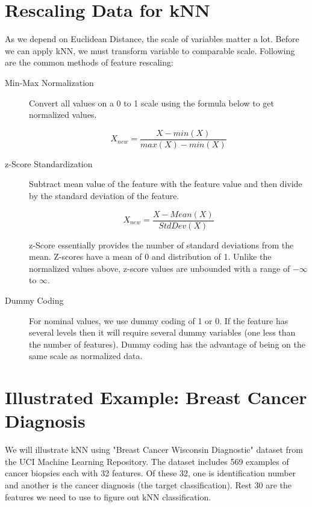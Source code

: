 \documentclass[11pt, letterpaper, twoside]{memoir}\usepackage{knitr}
\begin{document}
\section{Rescaling Data for kNN}

As we depend on Euclidean Distance, the scale of variables matter a lot. Before we can apply kNN, we must transform variable to comparable scale. Following are the common methods of feature rescaling:

\begin{description}

\item [Min-Max Normalization] Convert all values on a 0 to 1 scale using the formula below to get normalized values.

\[X_{new} = \frac{X - min(X)}{max(X) - min(X)}   \]

\item [z-Score Standardization] Subtract mean value of the feature with the feature value and then divide by the standard deviation of the feature.

\[X_{new} = \frac{X - Mean(X)}{StdDev(X)} \]

z-Score essentially provides the number of standard deviations from the mean. Z-scores have a mean of 0 and distribution of 1. Unlike the normalized values above, z-score values are unbounded with a range of $-\infty$ to $\infty$.

\item [Dummy Coding] For nominal values, we use dummy coding of 1 or 0. If the feature has several levels then it will require several dummy variables (one less than the number of features). Dummy coding has the advantage of being on the same scale as normalized data.
\end{description}

\section{Illustrated Example: Breast Cancer Diagnosis}

We will illustrate kNN using "Breast Cancer Wisconsin Diagnostic" dataset from the UCI Machine Learning Repository. The dataset includes 569 examples of cancer biopsies each with 32 features. Of these 32, one is identification number and another is the cancer diagnosis (the target classification). Rest 30 are the features we need to use to figure out kNN classification.

\begin{knitrout}
\color{fgcolor}\begin{kframe}
\begin{alltt}
 \hlkwb{<-} \hlstd{(}\hlstd{,}  \hlstd{=} \hlstd{)}
\end{alltt}
\end{kframe}
\end{knitrout}
\end{document}
